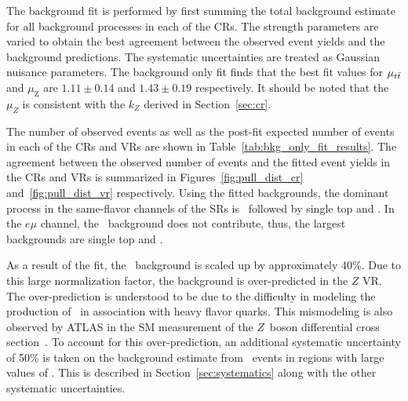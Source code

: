 The background fit is performed by first summing the total background estimate
for all background processes in each of the CRs.
The strength parameters are varied to obtain the best agreement between
the observed event yields and the background predictions.
The systematic uncertainties are treated as Gaussian nuisance parameters.
The background only fit finds that the best fit values for $\mu_{t\bar{t}}$ and
$\mu_\mathrm{Z}$ are $1.11 \pm 0.14$ and $1.43 \pm 0.19$ respectively.
It should be noted that the $\mu_Z$ is consistent with the $k_Z$
derived in Section~\ref{sec:cr}.

The number of observed events as well as the post-fit expected number
of events in each of the CRs and VRs are shown in
Table~\ref{tab:bkg_only_fit_results}.
The agreement between the observed number of events and the fitted event
yields in the CRs and VRs is summarized in
Figures~\ref{fig:pull_dist_cr} and~\ref{fig:pull_dist_vr} respectively.
Using the fitted backgrounds, the dominant process in the same-flavor
channels of the SRs is \ZGAMMAJETS\ followed by single top and
\TTBAR. In the $e\mu$ channel, the \ZGAMMAJETS\ background does
not contribute, thus, the largest backgrounds are single top and \TTBAR.

As a result of the fit, the \ZGAMMAJETS\ background is scaled up by
approximately 40\%.
Due to this large normalization factor, the background is over-predicted in
the $Z$ VR.
The over-prediction is understood to be due to the difficulty in modeling
the production of \ZGAMMA\ in association with heavy flavor quarks.
This mismodeling is also observed by ATLAS in the SM measurement of
the $Z$~boson differential cross section~\cite{Aad:2013ysa,Aad:2014dvb}.
To account for this over-prediction, an additional systematic uncertainty of
50\% is taken on the background estimate from \ZGAMMAJETS\ events in regions
with large values of \HT.
This is described in Section~\ref{sec:systematics} along with the other
systematic uncertainties.

